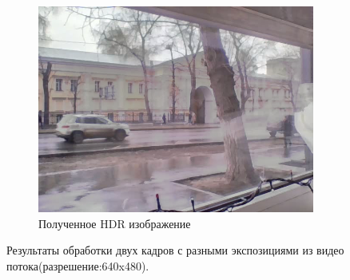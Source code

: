 \begin{figure}[!tbp]
\begin{subfigure}{1\textwidth}
    \includegraphics[width=\textwidth]{img/hdr_car_deghost.png}
    \caption{ Полученное HDR изображение}
    \label{fig:hdr_car2}
  \end{subfigure}
  \caption { Результаты обработки двух кадров с разными экспозициями из видео потока(разрешение:640x480).}
  \label{fig:hdr_car_pipeline}
\end{figure}

